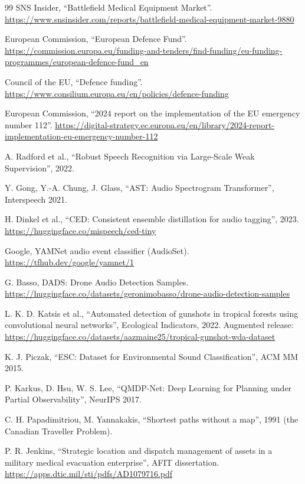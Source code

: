 \begin{thebibliography}{99}
 SNS Insider, ``Battlefield Medical Equipment Market''.
\url{https://www.snsinsider.com/reports/battlefield-medical-equipment-market-9880}

 European Commission, ``European Defence Fund''.
\url{https://commission.europa.eu/funding-and-tenders/find-funding/eu-funding-programmes/european-defence-fund_en}

 Council of the EU, ``Defence funding''. \url{https://www.consilium.europa.eu/en/policies/defence-funding}

 European Commission, ``2024 report on the implementation of the EU emergency number 112''.
\url{https://digital-strategy.ec.europa.eu/en/library/2024-report-implementation-eu-emergency-number-112}

 A. Radford et al., ``Robust Speech Recognition via Large-Scale Weak Supervision'', 2022.

 Y. Gong, Y.-A. Chung, J. Glass, ``AST: Audio Spectrogram Transformer'', Interspeech 2021.

 H. Dinkel et al., ``CED: Consistent ensemble distillation for audio tagging'', 2023. \url{https://huggingface.co/mispeech/ced-tiny}

 Google, YAMNet audio event classifier (AudioSet). \url{https://tfhub.dev/google/yamnet/1}

 G. Basso, DADS: Drone Audio Detection Samples. \url{https://huggingface.co/datasets/geronimobasso/drone-audio-detection-samples}

 L. K. D. Katsis et al., ``Automated detection of gunshots in tropical forests using convolutional neural networks'',
Ecological Indicators, 2022. Augmented release: \url{https://huggingface.co/datasets/aazmaine25/tropical-gunshot-wda-dataset}

 K. J. Piczak, ``ESC: Dataset for Environmental Sound Classification'', ACM MM 2015.

 P. Karkus, D. Hsu, W. S. Lee, ``QMDP-Net: Deep Learning for Planning under Partial Observability'', NeurIPS 2017.

 C. H. Papadimitriou, M. Yannakakis, ``Shortest paths without a map'', 1991 (the Canadian Traveller Problem).

 P. R. Jenkins, ``Strategic location and dispatch management of assets in a military medical evacuation enterprise'',
AFIT dissertation. \url{https://apps.dtic.mil/sti/pdfs/AD1079716.pdf}

\end{thebibliography}
\nocite{*}
